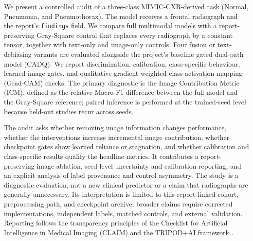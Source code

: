 We present a controlled audit of a three-class MIMIC-CXR-derived task
(Normal, Pneumonia, and Pneumothorax). The model receives a frontal radiograph
and the report's \texttt{findings} field. We compare full multimodal models
with a report-preserving Gray-Square control that replaces every radiograph by
a constant tensor, together with text-only and image-only controls. Four
fusion or text-debiasing variants are evaluated alongside the project's
baseline gated dual-path model (CADQ). We
report discrimination, calibration, class-specific behaviour, learned image
gates, and qualitative gradient-weighted class activation mapping (Grad-CAM)
checks. The primary diagnostic is the Image
Contribution Metric (ICM), defined as the relative Macro-F1 difference between
the full model and the Gray-Square reference; paired inference is performed at
the trained-seed level because held-out studies recur across seeds.

The audit asks whether removing image information changes performance, whether
the interventions increase incremental image contribution, whether checkpoint
gates show learned reliance or stagnation, and whether calibration and
class-specific results qualify the headline metrics. It contributes a
report-preserving image ablation, seed-level uncertainty and calibration
reporting, and an explicit analysis of label provenance and control asymmetry.
The study is a diagnostic evaluation, not a new clinical predictor or a claim
that radiographs are generally unnecessary. Its interpretation is limited to
this report-linked cohort, preprocessing path, and checkpoint archive; broader
claims require corrected implementations, independent labels, matched controls,
and external validation. Reporting follows the transparency principles of the
Checklist for Artificial Intelligence in Medical Imaging (CLAIM) and the
TRIPOD+AI framework \citep{mongan2024claim,collins2024tripodai}.
